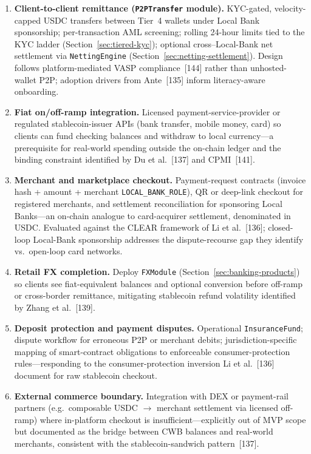 \documentclass[12pt,a4paper]{report}
\begin{document}
\begin{enumerate}[noitemsep]
\item \textbf{Client-to-client remittance (\texttt{P2PTransfer} module).} KYC-gated, velocity-capped USDC transfers between Tier~4 wallets under Local Bank sponsorship; per-transaction AML screening; rolling 24-hour limits tied to the KYC ladder (Section~\ref{sec:tiered-kyc}); optional cross--Local-Bank net settlement via \texttt{NettingEngine} (Section~\ref{sec:netting-settlement}). Design follows platform-mediated VASP compliance~[144] rather than unhosted-wallet P2P; adoption drivers from Ante~[135] inform literacy-aware onboarding.
\item \textbf{Fiat on/off-ramp integration.} Licensed payment-service-provider or regulated stablecoin-issuer APIs (bank transfer, mobile money, card) so clients can fund checking balances and withdraw to local currency---a prerequisite for real-world spending outside the on-chain ledger and the binding constraint identified by Du et al.~[137] and CPMI~[141].
\item \textbf{Merchant and marketplace checkout.} Payment-request contracts (invoice hash + amount + merchant \texttt{LOCAL\_BANK\_ROLE}), QR or deep-link checkout for registered merchants, and settlement reconciliation for sponsoring Local Banks---an on-chain analogue to card-acquirer settlement, denominated in USDC. Evaluated against the CLEAR framework of Li et al.~[136]; closed-loop Local-Bank sponsorship addresses the dispute-recourse gap they identify vs.\ open-loop card networks.
\item \textbf{Retail FX completion.} Deploy \texttt{FXModule} (Section~\ref{sec:banking-products}) so clients see fiat-equivalent balances and optional conversion before off-ramp or cross-border remittance, mitigating stablecoin refund volatility identified by Zhang et al.~[139].
\item \textbf{Deposit protection and payment disputes.} Operational \texttt{InsuranceFund}; dispute workflow for erroneous P2P or merchant debits; jurisdiction-specific mapping of smart-contract obligations to enforceable consumer-protection rules---responding to the consumer-protection inversion Li et al.~[136] document for raw stablecoin checkout.
\item \textbf{External commerce boundary.} Integration with DEX or payment-rail partners (e.g.\ composable USDC $\to$ merchant settlement via licensed off-ramp) where in-platform checkout is insufficient---explicitly out of MVP scope but documented as the bridge between CWB balances and real-world merchants, consistent with the stablecoin-sandwich pattern~[137].
\end{enumerate}
\end{document}
